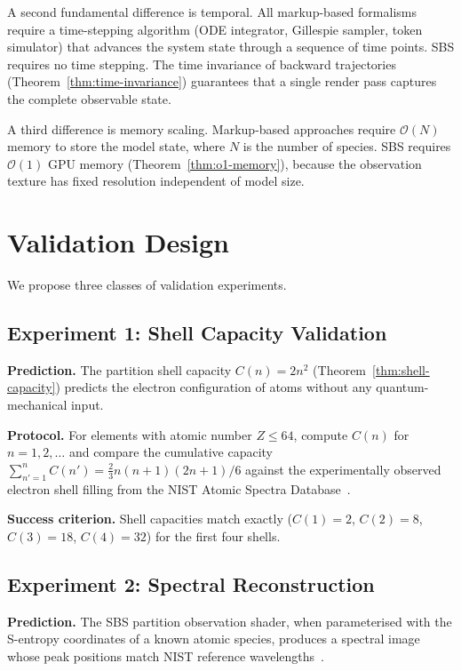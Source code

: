 \documentclass[11pt,twocolumn,a4paper]{article}
\newcommand{\BigO}{\mathcal{O}}
\begin{document}
A second fundamental difference is temporal.  All markup-based
formalisms require a time-stepping algorithm (ODE integrator,
Gillespie sampler, token simulator) that advances the system state
through a sequence of time points.  SBS requires no time stepping.
The time invariance of backward trajectories
(Theorem~\ref{thm:time-invariance}) guarantees that a single render
pass captures the complete observable state.

A third difference is memory scaling.  Markup-based approaches require
$\BigO(N)$ memory to store the model state, where $N$ is the number of
species.  SBS requires $\BigO(1)$ GPU memory
(Theorem~\ref{thm:o1-memory}), because the observation texture has
fixed resolution independent of model size.


\section{Validation Design}
\label{sec:validation}

We propose three classes of validation experiments.

\subsection{Experiment 1: Shell Capacity Validation}

\textbf{Prediction.}  The partition shell capacity $C(n) = 2n^2$
(Theorem~\ref{thm:shell-capacity}) predicts the electron
configuration of atoms without any quantum-mechanical input.

\textbf{Protocol.}  For elements with atomic number $Z \leq 64$,
compute $C(n)$ for $n = 1, 2, \ldots$ and compare the cumulative
capacity $\sum_{n'=1}^{n} C(n') = \frac{2}{3}n(n+1)(2n+1)/6$ against
the experimentally observed electron shell filling from the NIST
Atomic Spectra Database~\citep{nist_asd}.

\textbf{Success criterion.}  Shell capacities match exactly
($C(1) = 2$, $C(2) = 8$, $C(3) = 18$, $C(4) = 32$) for the first
four shells.

\subsection{Experiment 2: Spectral Reconstruction}

\textbf{Prediction.}  The SBS partition observation shader, when
parameterised with the S-entropy coordinates of a known atomic species,
produces a spectral image whose peak positions match NIST reference
wavelengths~\citep{nist_asd,herzberg1944}.
\end{document}
